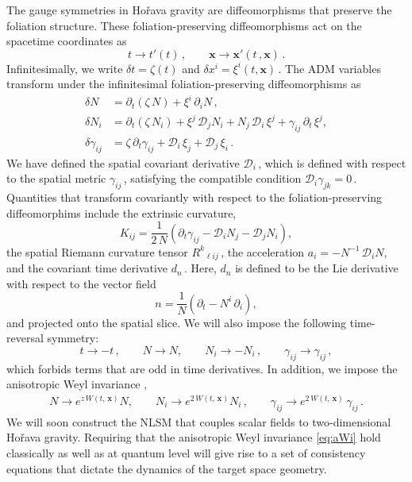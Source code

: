 \documentclass[11pt]{article}
\newcommand{\be}{\begin{equation}}
\newcommand{\ee}{\end{equation}}
\newcommand{\CD}{\mathcal{D}}
\newcommand{\lr}{\left (}
\newcommand{\rr}{\right )}
\newcommand{\p}{\partial}
\begin{document}
The gauge symmetries in Ho\v{r}ava gravity are diffeomorphisms that preserve the foliation structure. These foliation-preserving diffeomorphisms act on the spacetime coordinates as
%
\be \label{eq:fp}
	t \rightarrow t' (t)\,,
		\qquad
	\mathbf{x} \rightarrow \mathbf{x'} (t\,, \mathbf{x})\,.
\ee
%
Infinitesimally, we write $\delta t = \zeta(t)$ and $\delta x^i = \xi^i (t, \mathbf{x})$\,. 
The ADM variables transform under the infinitesimal foliation-preserving diffeomorphisms as
%
\begin{subequations} \label{eq:fpd}
\begin{align}
	\delta N & = \p^{}_t \! \lr \zeta \, N \rr + \xi^i \, \p_{i} N\,, \\[2pt]
	\delta N_i & = \p^{}_t \! \lr \zeta \, N_i \rr + \xi^j \, \CD_{\!j} N_i + N_j \, \CD_{i} \, \xi^j + \gamma_{ij} \, \p_t \, \xi^j, \\[2pt]
	\delta \gamma_{ij} & = \zeta \, \p^{}_t \gamma_{ij} + \CD_{i} \, \xi_j + \CD_{\!j} \, \xi_i\,.
\end{align}
\end{subequations}
%
We have defined the spatial covariant derivative $\CD_{i}$\,, which is defined with respect to the spatial metric $\gamma_{ij}$\,, satisfying the compatible condition $\CD^{}_{\!i} \gamma^{}_{jk} = 0$\,. Quantities that transform covariantly with respect to the foliation-preserving diffeomorphims include the extrinsic curvature,
%
\be
	K_{ij} = \frac{1}{2 \, N} \lr \p_t {\gamma}_{ij} - \CD_{i} N_j - \CD_{j} N_i \rr,
\ee
%
the spatial Riemann curvature tensor $R^k{}_{\ell ij}$\,, the acceleration $a_i = - N^{-1} \, \CD_{i} N$, and the covariant time derivative $d_n$\,. Here, $d_n$ is defined to be the Lie derivative with respect to the vector field 
%
\be \label{eq:nvf}
	n = \frac{1}{N} \lr \p_t - N^i \, \p_i \rr,
\ee
%
and projected onto the spatial slice. 
We will also impose the following time-reversal symmetry:
%
\be \label{eq:trs}
	t \rightarrow - t\,,
		\qquad
	N \rightarrow N,
		\qquad
	N_i \rightarrow - N_i\,,
		\qquad
	\gamma_{ij} \rightarrow \gamma_{ij}\,,
\ee
%
which forbids terms that are odd in time derivatives. In addition, we impose the anisotropic Weyl invariance \cite{Horava:2008ih},
%
\begin{align} \label{eq:aWi}
	N \rightarrow e^{z \, W(t,\, \mathbf{x})} N, 
		\qquad%
	N_i \rightarrow e^{2 \, W(t,\, \mathbf{x})} N_i\,,
		\qquad%
	\gamma_{ij} \rightarrow e^{2 \, W(t,\, \mathbf{x})} \, \gamma_{ij}\,.
\end{align}
%
We will soon construct the NLSM that couples scalar fields to two-dimensional Ho\v{r}ava gravity. Requiring that the anisotropic Weyl invariance \eqref{eq:aWi} hold classically as well as at quantum level will give rise to a set of consistency equations that dictate the dynamics of the target space geometry.
\end{document}
